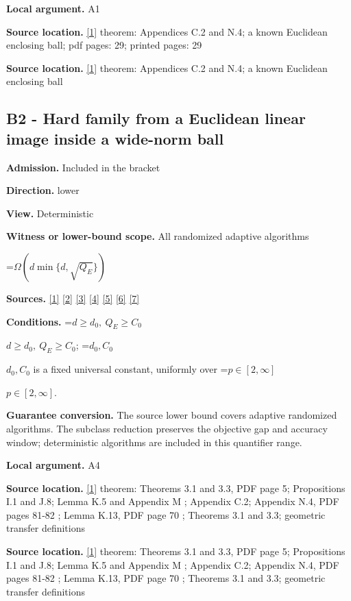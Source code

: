 \documentclass[10pt,a4paper]{article}
\newcommand{\AtlasMath}[1]{\par\begingroup\centering\setbox0=\hbox{$\displaystyle #1$}\ifdim\wd0>1.4\linewidth\typeout{ATLAS WIDE FORMULA: \the\wd0}\fi\ifdim\wd0>\linewidth\resizebox{\linewidth}{!}{\box0}\else\box0\fi\par\endgroup}
\newcommand{\AtlasInlineMath}[1]{\begingroup\setbox0=\hbox{$#1$}\ifdim\wd0>.4\linewidth\endgroup\AtlasMath{#1}\else\endgroup$#1$\fi}
\begin{document}
\textbf{Local argument.} A1

\textbf{Source location.} \href{https://arxiv.org/html/2610.00345v1}{[1]} theorem: Appendices C.2 and N.4; a known Euclidean enclosing ball; pdf pages: 29; printed pages: 29

\textbf{Source location.} \href{https://arxiv.org/html/2610.00345v1}{[1]} theorem: Appendices C.2 and N.4; a known Euclidean enclosing ball

\subsection{B2 - Hard family from a Euclidean linear image inside a wide-norm ball}
\textbf{Admission.} Included in the bracket

\textbf{Direction.} lower

\textbf{View.} Deterministic

\textbf{Witness or lower-bound scope.} All randomized adaptive algorithms

\AtlasMath{\Omega(d\min\{d,\sqrt{Q_E}\})}
\textbf{Sources.} \href{https://arxiv.org/html/2610.00345v1}{[1]} \href{https://arxiv.org/html/2607.16558v2}{[2]} \href{https://www.mathnet.ru/php/archive.phtml?jrnid=mzm&option_lang=eng&paperid=1697&wshow=paper}{[3]} \href{https://arxiv.org/abs/1802.09022}{[4]} \href{https://proceedings.neurips.cc/paper_files/paper/2022/file/329ef22fd8cb68223d5df09a037f7dd9-Paper-Conference.pdf}{[5]} \href{https://jmlr.org/papers/volume18/16-632/16-632.pdf}{[6]} \href{https://arxiv.org/pdf/1707.08486v2}{[7]}

\textbf{Conditions.} \AtlasInlineMath{d\ge d_0,\ Q_E\ge C_0}; \AtlasInlineMath{d_0,C_0} is a fixed universal constant, uniformly over \AtlasInlineMath{p\in [2,\infty ]}.

\textbf{Guarantee conversion.} The source lower bound covers adaptive randomized algorithms. The subclass reduction preserves the objective gap and accuracy window; deterministic algorithms are included in this quantifier range.

\textbf{Local argument.} A4

\textbf{Source location.} \href{https://arxiv.org/html/2610.00345v1}{[1]} theorem: Theorems 3.1 and 3.3, PDF page 5; Propositions I.1 and J.8; Lemma K.5 and Appendix M ; Appendix C.2; Appendix N.4, PDF pages 81-82 ; Lemma K.13, PDF page 70 ; Theorems 3.1 and 3.3; geometric transfer definitions

\textbf{Source location.} \href{https://arxiv.org/html/2610.00345v1}{[1]} theorem: Theorems 3.1 and 3.3, PDF page 5; Propositions I.1 and J.8; Lemma K.5 and Appendix M ; Appendix C.2; Appendix N.4, PDF pages 81-82 ; Lemma K.13, PDF page 70 ; Theorems 3.1 and 3.3; geometric transfer definitions
\end{document}
